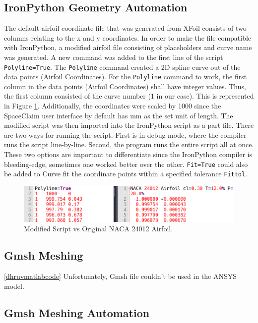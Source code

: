 \documentclass[english]{kththesis}
\begin{document}
\subsection{IronPython Geometry Automation} \label{subsec:ironpython_geometry}
The default airfoil coordinate file that was generated from XFoil consists of two columns relating to the x and y coordinates. In order to make the file compatible with IronPython, a modified airfoil file consisting of placeholders and curve name was generated. A new command was added to the first line of the script \lstinline{Polyline=True}. The \lstinline{Polyline} command created a 2D spline curve out of the data points (Airfoil Coordinates). For the \lstinline{Polyline} command to work, the first column in the data points (Airfoil Coordinates) shall have integer values. Thus, the first column consisted of the curve number (1 in our case). This is represented in Figure \ref{fig:airscript}. Additionally, the coordinates were scaled by 1000 since the SpaceClaim user interface by default has mm as the set unit of length. \hfill \break
The modified script was then imported into the IronPython script as a part file. There are two ways for running the script. First is in debug mode, where the compiler runs the script line-by-line. Second, the program runs the entire script all at once. These two options are important to differentiate since the IronPython compiler is bleeding-edge, sometimes one worked better over the other. \lstinline{Fit=True} could also be added to Curve fit the coordinate points within a specified tolerance \lstinline{Fittol}.
\begin{figure}[!htb]
    \centering
    \includegraphics[width=1\textwidth]{IPS/notepad++_woSEXWc0kh.png}
    \caption{Modified Script vs Original NACA 24012 Airfoil.}
    \label{fig:airscript}
\end{figure}

\subsection{Gmsh Meshing} \ref{dhruvmatlabcode} Unfortunately, Gmsh file couldn't be used in the ANSYS model.
\subsection{Gmsh Meshing Automation} \label{subsec:gmsh_mesh}
\end{document}
